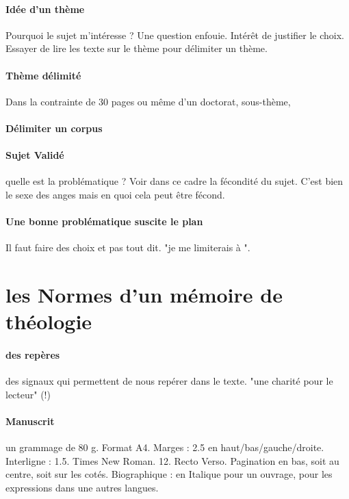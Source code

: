 \paragraph{Idée d'un thème} Pourquoi le sujet m'intéresse ?  Une question enfouie. Intérêt de justifier le choix. Essayer de lire les texte sur le thème pour délimiter un thème.

\paragraph{Thème délimité} Dans la contrainte de 30 pages ou même d'un doctorat, sous-thème, 


\paragraph{Délimiter un corpus} 

\paragraph{Sujet Validé} quelle est la problématique ? Voir dans ce cadre la fécondité du sujet. C'est bien le sexe des anges mais en quoi cela peut être fécond.


\paragraph{Une bonne problématique suscite le plan } Il faut faire des choix et pas tout dit. "je me limiterais à ".

\section{les Normes d'un mémoire de théologie}

\paragraph{des repères} des signaux qui permettent de nous repérer dans le texte. "une charité pour le lecteur" (!)

\paragraph{Manuscrit} un grammage de 80 g.  Format A4. Marges : 2.5 en haut/bas/gauche/droite. Interligne : 1.5. Times New Roman. 12. Recto Verso. Pagination en bas, soit au centre, soit sur les cotés. Biographique : en Italique pour un ouvrage, pour les expressions dans une autres langues. 

